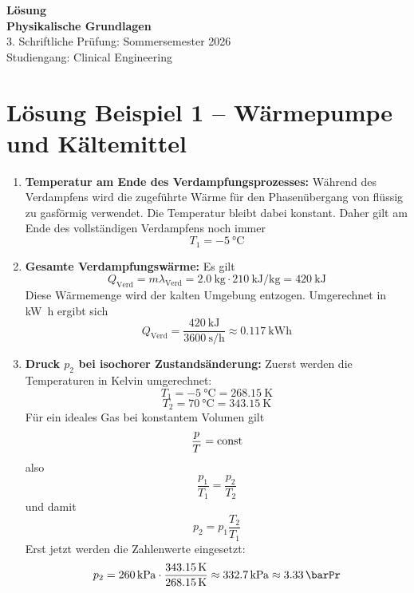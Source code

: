 \documentclass[11pt, a4paper]{article}
\begin{document}
\noindent
\vspace{9cm}
\begin{center}
    {\Huge \textbf{Lösung}} \\[1.5em]
    {\Large \textbf{Physikalische Grundlagen}} \\[1em]
    {\large 3. Schriftliche Prüfung: Sommersemester 2026} \\[1em]
    {\large Studiengang: Clinical Engineering}
\end{center}

\newpage

\section*{Lösung Beispiel 1 -- Wärmepumpe und Kältemittel}
\begin{enumerate}
    \item \textbf{Temperatur am Ende des Verdampfungsprozesses:}
    Während des Verdampfens wird die zugeführte Wärme für den Phasenübergang von flüssig zu gasförmig verwendet. Die Temperatur bleibt dabei konstant. Daher gilt am Ende des vollständigen Verdampfens noch immer
    \[
        T_1 = \SI{-5}{\degreeCelsius}
    \]

    \item \textbf{Gesamte Verdampfungswärme:}
    Es gilt
    \[
        Q_{\text{Verd}} = m \lambda_{\text{Verd}} = \SI{2.0}{\kilogram} \cdot \SI{210}{\kilo\joule\per\kilogram} = \SI{420}{\kilo\joule}
    \]
    Diese Wärmemenge wird der kalten Umgebung entzogen. Umgerechnet in \si{\kilo\watt\hour} ergibt sich
    \[
        Q_{\text{Verd}} = \frac{\SI{420}{\kilo\joule}}{\SI{3600}{\second\per\hour}} \approx \SI{0.117}{\kilo\watt\hour}
    \]

    \item \textbf{Druck $p_2$ bei isochorer Zustandsänderung:}
    Zuerst werden die Temperaturen in Kelvin umgerechnet:
    \[
        T_1 = \SI{-5}{\degreeCelsius} = \SI{268.15}{\kelvin}
    \]
    \[
        T_2 = \SI{70}{\degreeCelsius} = \SI{343.15}{\kelvin}
    \]
    Für ein ideales Gas bei konstantem Volumen gilt
    \[
        \frac{p}{T} = \mathrm{const}
    \]
    also
    \[
        \frac{p_1}{T_1} = \frac{p_2}{T_2}
    \]
    und damit
    \[
        p_2 = p_1 \frac{T_2}{T_1}
    \]
    Erst jetzt werden die Zahlenwerte eingesetzt:
    \[
        p_2 = \SI{260}{\kilo\pascal} \cdot \frac{\SI{343.15}{\kelvin}}{\SI{268.15}{\kelvin}} \approx \SI{332.7}{\kilo\pascal} \approx \SI{3.33}{\barPr}
    \]


\end{enumerate}
\end{document}
